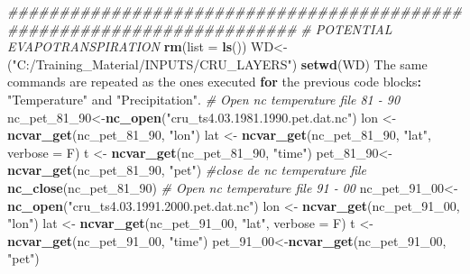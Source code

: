 \documentclass[
  10pt,
  b5paper,
]{book}
\newenvironment{Shaded}{\begin{snugshade}}{\end{snugshade}}
\newcommand{\CommentTok}[1]{\textcolor[rgb]{0.56,0.35,0.01}{\textit{#1}}}
\newcommand{\ControlFlowTok}[1]{\textcolor[rgb]{0.13,0.29,0.53}{\textbf{#1}}}
\newcommand{\DataTypeTok}[1]{\textcolor[rgb]{0.13,0.29,0.53}{#1}}
\newcommand{\DecValTok}[1]{\textcolor[rgb]{0.00,0.00,0.81}{#1}}
\newcommand{\KeywordTok}[1]{\textcolor[rgb]{0.13,0.29,0.53}{\textbf{#1}}}
\newcommand{\NormalTok}[1]{#1}
\newcommand{\OperatorTok}[1]{\textcolor[rgb]{0.81,0.36,0.00}{\textbf{#1}}}
\newcommand{\StringTok}[1]{\textcolor[rgb]{0.31,0.60,0.02}{#1}}
\begin{document}
\begin{Shaded}
\begin{Highlighting}[]
\CommentTok{########################################################################}
\CommentTok{# POTENTIAL EVAPOTRANSPIRATION }
 \KeywordTok{rm}\NormalTok{(}\DataTypeTok{list =} \KeywordTok{ls}\NormalTok{())}
\NormalTok{WD<-(}\StringTok{"C:/Training_Material/INPUTS/CRU_LAYERS"}\NormalTok{)}
\KeywordTok{setwd}\NormalTok{(WD)}
\NormalTok{The same commands are repeated as the ones executed }\ControlFlowTok{for}\NormalTok{ the previous code blocks}\OperatorTok{:}\StringTok{ "Temperature"}\NormalTok{ and }\StringTok{"Precipitation"}\NormalTok{. }
\CommentTok{# Open nc temperature file 81 - 90}
\NormalTok{nc_pet_}\DecValTok{81}\NormalTok{_}\DecValTok{90}\NormalTok{<-}\KeywordTok{nc_open}\NormalTok{(}\StringTok{"cru_ts4.03.1981.1990.pet.dat.nc"}\NormalTok{)}
\NormalTok{ lon <-}\StringTok{ }\KeywordTok{ncvar_get}\NormalTok{(nc_pet_}\DecValTok{81}\NormalTok{_}\DecValTok{90}\NormalTok{, }\StringTok{"lon"}\NormalTok{)}
\NormalTok{lat <-}\StringTok{ }\KeywordTok{ncvar_get}\NormalTok{(nc_pet_}\DecValTok{81}\NormalTok{_}\DecValTok{90}\NormalTok{, }\StringTok{"lat"}\NormalTok{, }\DataTypeTok{verbose =}\NormalTok{ F)}
\NormalTok{t <-}\StringTok{ }\KeywordTok{ncvar_get}\NormalTok{(nc_pet_}\DecValTok{81}\NormalTok{_}\DecValTok{90}\NormalTok{, }\StringTok{"time"}\NormalTok{)}
\NormalTok{ pet_}\DecValTok{81}\NormalTok{_}\DecValTok{90}\NormalTok{<-}\KeywordTok{ncvar_get}\NormalTok{(nc_pet_}\DecValTok{81}\NormalTok{_}\DecValTok{90}\NormalTok{, }\StringTok{"pet"}\NormalTok{)}
 \CommentTok{#close de nc temperature file}
 \KeywordTok{nc_close}\NormalTok{(nc_pet_}\DecValTok{81}\NormalTok{_}\DecValTok{90}\NormalTok{) }
 \CommentTok{# Open nc temperature file 91 - 00}
\NormalTok{ nc_pet_}\DecValTok{91}\NormalTok{_}\DecValTok{00}\NormalTok{<-}\KeywordTok{nc_open}\NormalTok{(}\StringTok{"cru_ts4.03.1991.2000.pet.dat.nc"}\NormalTok{)}
\NormalTok{ lon <-}\StringTok{ }\KeywordTok{ncvar_get}\NormalTok{(nc_pet_}\DecValTok{91}\NormalTok{_}\DecValTok{00}\NormalTok{, }\StringTok{"lon"}\NormalTok{)}
\NormalTok{lat <-}\StringTok{ }\KeywordTok{ncvar_get}\NormalTok{(nc_pet_}\DecValTok{91}\NormalTok{_}\DecValTok{00}\NormalTok{, }\StringTok{"lat"}\NormalTok{, }\DataTypeTok{verbose =}\NormalTok{ F)}
\NormalTok{t <-}\StringTok{ }\KeywordTok{ncvar_get}\NormalTok{(nc_pet_}\DecValTok{91}\NormalTok{_}\DecValTok{00}\NormalTok{, }\StringTok{"time"}\NormalTok{)}
\NormalTok{ pet_}\DecValTok{91}\NormalTok{_}\DecValTok{00}\NormalTok{<-}\KeywordTok{ncvar_get}\NormalTok{(nc_pet_}\DecValTok{91}\NormalTok{_}\DecValTok{00}\NormalTok{, }\StringTok{"pet"}\NormalTok{)}

\end{Highlighting}
\end{Shaded}
\end{document}
